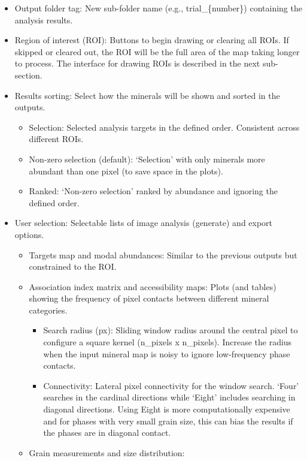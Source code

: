 		\begin{itemize}
			
			\item Output folder tag: New sub-folder name (e.g., trial\_\{number\}) containing the analysis results.
			\item Region of interest (ROI): Buttons to begin drawing or clearing all ROIs. If skipped or cleared out, the ROI will be the full area of the map taking longer to process. The interface for drawing ROIs is described in the next sub-section.
			\item Results sorting: Select how the minerals will be shown and sorted in the outputs. 
				\begin{itemize}
					\item Selection: Selected analysis targets in the defined order. Consistent across different ROIs.
					\item Non-zero selection (default): `Selection' with only minerals more abundant than one pixel (to save space in the plots). 
					\item Ranked: `Non-zero selection' ranked by abundance and ignoring the defined order.
				\end{itemize}
			\item User selection: Selectable lists of image analysis (generate) and export options.
				\begin{itemize}
					\item Targets map and modal abundances:	Similar to the previous outputs but constrained to the ROI.
					\item Association index matrix and accessibility maps: Plots (and tables) showing the frequency of pixel contacts between different mineral categories.
						\begin{itemize}
							\item Search radius (px): Sliding window radius around the central pixel to configure a square kernel (n\_pixels x n\_pixels). Increase the radius when the input mineral map is noisy to ignore low-frequency phase contacts.
							\item Connectivity: Lateral pixel connectivity for the window search. `Four' searches in the cardinal directions while `Eight' includes searching in diagonal directions. Using Eight is more computationally expensive and for phases with very small grain size, this can bias the results if the phases are in diagonal contact.
						\end{itemize}
					\item Grain measurements and size distribution:	

\end{itemize}
\end{itemize}
